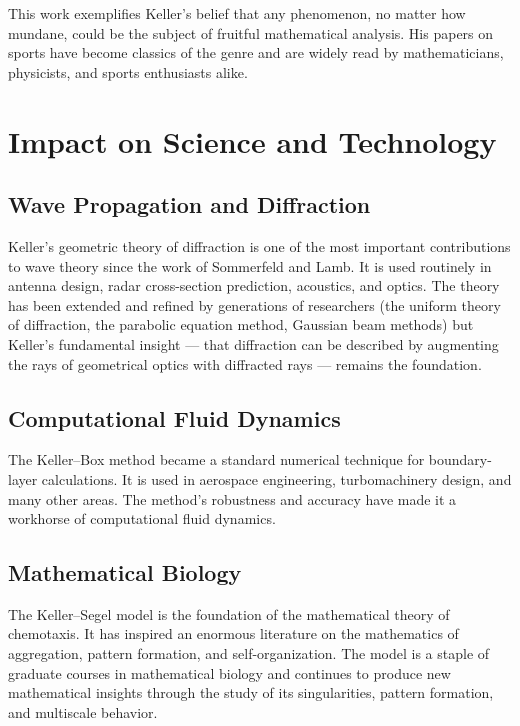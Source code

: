 This work exemplifies Keller's belief that any phenomenon, no matter how mundane, could be the subject of fruitful mathematical analysis. His papers on sports have become classics of the genre and are widely read by mathematicians, physicists, and sports enthusiasts alike.

\section{Impact on Science and Technology}

\subsection{Wave Propagation and Diffraction}

Keller's geometric theory of diffraction is one of the most important contributions to wave theory since the work of Sommerfeld and Lamb. It is used routinely in antenna design, radar cross-section prediction, acoustics, and optics. The theory has been extended and refined by generations of researchers (the uniform theory of diffraction, the parabolic equation method, Gaussian beam methods) but Keller's fundamental insight --- that diffraction can be described by augmenting the rays of geometrical optics with diffracted rays --- remains the foundation.

\subsection{Computational Fluid Dynamics}

The Keller--Box method became a standard numerical technique for boundary-layer calculations. It is used in aerospace engineering, turbomachinery design, and many other areas. The method's robustness and accuracy have made it a workhorse of computational fluid dynamics.

\subsection{Mathematical Biology}

The Keller--Segel model is the foundation of the mathematical theory of chemotaxis. It has inspired an enormous literature on the mathematics of aggregation, pattern formation, and self-organization. The model is a staple of graduate courses in mathematical biology and continues to produce new mathematical insights through the study of its singularities, pattern formation, and multiscale behavior.

